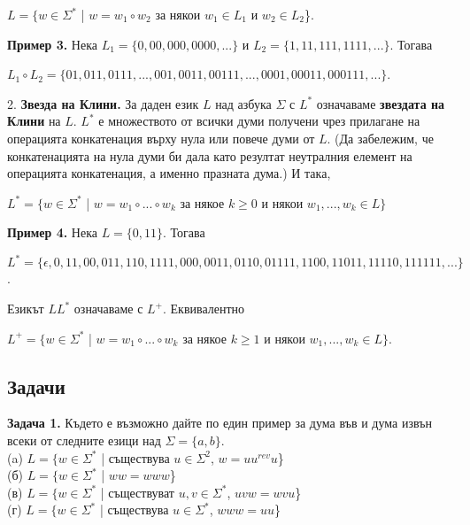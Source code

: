 \documentclass[openany]{book}
\begin{document}
    \begin{center}
        $L = \{ w \in \Sigma^*$ | $w = w_1 \circ w_2$ за някои $w_1 \in L_1$ и $w_2 \in L_2$\}.
    \end{center}

    \vspace{5pt}

    \textbf{Пример 3.} Нека $L_1 = \{0,00,000,0000,...\}$ и $L_2 = \{1,11,111,1111,...\}$. Тогава
    \begin{center}
        $L_1 \circ L_2 = \{01,011,0111,...,001,0011,00111,...,0001,00011,000111,...\}$.
    \end{center}
    \vspace{15pt}

    2. \textbf{Звезда на Клини.} За даден език $L$ над азбука $\Sigma$ с $L^*$ означаваме
    \textbf{звездата на Клини} на $L$. $L^*$ е множеството от всички думи получени чрез прилагане
    на операцията конкатенация върху нула или повече думи от $L$. (Да забележим, че конкатенацията
    на нула думи би дала като резултат неутралния елемент на операцията конкатенация, а именно празната
    дума.) И така,

    \begin{center}
        $L^* = \{w \in \Sigma^*$ | $w = w_1 \circ ... \circ w_k$ за някое $k \geq 0$ и някои $w_1,...,w_k \in L\}$
    \end{center}

    \vspace{5pt}

    \textbf{Пример 4.} Нека $L = \{0,11\}$. Тогава
    
    \vspace{5pt}

    $L^* = \{\epsilon,0,11,00,011,110,1111,000,0011,0110,01111,1100,11011,11110,111111,...\}$.

    \vspace{15pt}

    Езикът $LL^*$ означаваме с $L^+$. Еквивалентно

    \begin{center}
        $L^+ = \{w \in \Sigma^*$ | $w = w_1 \circ ... \circ w_k$ за някое $k \geq 1$ и някои $w_1,...,w_k \in L\}$.
    \end{center}
   
\vspace{25pt}

\subsection{Задачи}
    \textbf{Задача 1.} Където е възможно дайте по един пример за дума във и дума извън всеки от следните езици над $\Sigma = \{a,b\}$. \\
    (a) $L = \{w \in \Sigma^*$ | съществува $u \in \Sigma^2$, $w = uu^{rev}u$\} \\
    (б) $L = \{w \in \Sigma^*$ | $ww = www$\} \\
    (в) $L = \{w \in \Sigma^*$ | съществуват $u,v \in \Sigma^*$, $uvw = wvu$\} \\
    (г) $L = \{w \in \Sigma^*$ | съществува $u \in \Sigma^*$, $www = uu$\}
\end{document}
